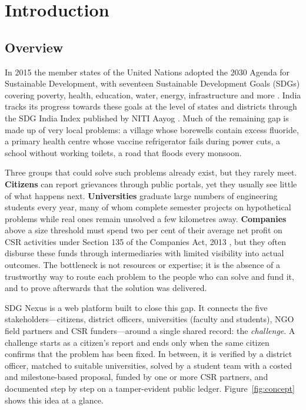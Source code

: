\chapter{Introduction}

\section{Overview}
In 2015 the member states of the United Nations adopted the 2030 Agenda for Sustainable Development, with seventeen Sustainable Development Goals (SDGs) covering poverty, health, education, water, energy, infrastructure and more \cite{un2015}. India tracks its progress towards these goals at the level of states and districts through the SDG India Index published by NITI Aayog \cite{niti2024}. Much of the remaining gap is made up of very local problems: a village whose borewells contain excess fluoride, a primary health centre whose vaccine refrigerator fails during power cuts, a school without working toilets, a road that floods every monsoon.

Three groups that could solve such problems already exist, but they rarely meet. \textbf{Citizens} can report grievances through public portals, yet they usually see little of what happens next. \textbf{Universities} graduate large numbers of engineering students every year, many of whom complete semester projects on hypothetical problems while real ones remain unsolved a few kilometres away. \textbf{Companies} above a size threshold must spend two per cent of their average net profit on CSR activities under Section 135 of the Companies Act, 2013 \cite{companiesact2013,csrrules2014}, but they often disburse these funds through intermediaries with limited visibility into actual outcomes. The bottleneck is not resources or expertise; it is the absence of a trustworthy way to route each problem to the people who can solve and fund it, and to prove afterwards that the solution was delivered.

SDG Nexus is a web platform built to close this gap. It connects the five stakeholders---citizens, district officers, universities (faculty and students), NGO field partners and CSR funders---around a single shared record: the \emph{challenge}. A challenge starts as a citizen's report and ends only when the same citizen confirms that the problem has been fixed. In between, it is verified by a district officer, matched to suitable universities, solved by a student team with a costed and milestone-based proposal, funded by one or more CSR partners, and documented step by step on a tamper-evident public ledger. Figure~\ref{fig:concept} shows this idea at a glance.

